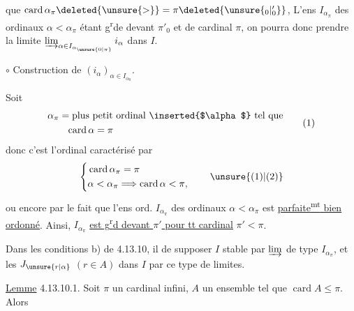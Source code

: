 
que $\operatorname{card}\alpha_\pi\deleted{\unsure{>}}=\pi\deleted{\unsure{{}_0|{}'_0}}$,
L'ens  $I_{\alpha_\pi}$ des
ordinaux $\alpha<\alpha_\pi$ étant g\textsuperscript{r}de devant $\pi'_0$
et de cardinal \deleted{$\unsure{\leq}$} $\pi$, on pourra donc
prendre la limite $\varinjlim_{\alpha\in I_{\alpha_{\unsure{0|\pi}}}}i_\alpha$ dans $I$.

$\circ$ Construction de $(i_\alpha)_{\alpha\in I_{\alpha_0}}$.

 Soit
\[
\begin{aligned}
\alpha_\pi&=\text{plus petit ordinal \inserted{$\alpha$} tel que}\\
&\phantom{=}\operatorname{card}\alpha=\pi
\end{aligned}\tag*{(1)}
\]
donc c'est l'ordinal caractérisé par
\[
\left\{\begin{aligned}
&\operatorname{card}\alpha_\pi=\pi\\
&\alpha<\alpha_\pi\Longrightarrow\operatorname{card}\alpha<\pi,
\end{aligned}\right.\tag*{\unsure{(1)|(2)}}
\]
ou encore par le fait que l'ens ord.
$I_{\alpha_\pi}$ des ordinaux $\alpha<\alpha_\pi$ est \uline{parfaite\textsuperscript{mt}
bien ordonné}.  Ainsi, $I_{\alpha_\pi}$ \uline{est
g\textsuperscript{r}d devant $\pi'$ pour tt cardinal} $\pi'<\pi$.

Dans les conditions b)  de 4.13.10, il 
de supposer $I$ stable par $\varinjlim$ de
type $I_{\alpha_\pi}$, et les $J_{\unsure{r|\alpha}}$ $(r\in A)$
 dans $I$ par ce type de limites.

 \uline{Lemme} 4.13.10.1. Soit $\pi$ un cardinal infini,
$A$ un ensemble  tel que $\operatorname{card}A\leq\pi$. Alors
